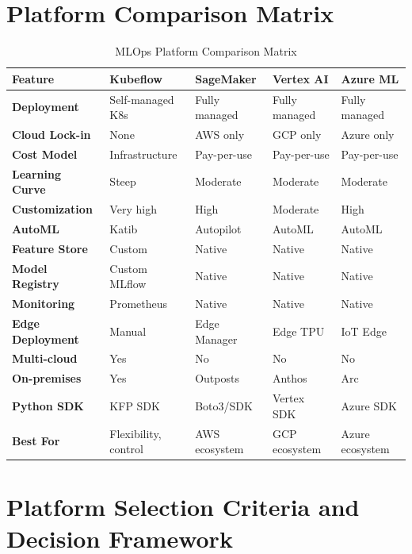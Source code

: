 \section{Platform Comparison Matrix}

\begin{table}[h]
\centering
\small
\begin{tabular}{|p{3.2cm}|p{2.3cm}|p{2.3cm}|p{2.3cm}|p{2.3cm}|}
\hline
\textbf{Feature} & \textbf{Kubeflow} & \textbf{SageMaker} & \textbf{Vertex AI} & \textbf{Azure ML} \\
\hline
\textbf{Deployment} & Self-managed K8s & Fully managed & Fully managed & Fully managed \\
\hline
\textbf{Cloud Lock-in} & None & AWS only & GCP only & Azure only \\
\hline
\textbf{Cost Model} & Infra\-structure & Pay-per-use & Pay-per-use & Pay-per-use \\
\hline
\textbf{Learning Curve} & Steep & Moderate & Moderate & Moderate \\
\hline
\textbf{Customization} & Very high & High & Moderate & High \\
\hline
\textbf{AutoML} & Katib & Autopilot & AutoML & AutoML \\
\hline
\textbf{Feature Store} & Custom & Native & Native & Native \\
\hline
\textbf{Model Registry} & \shortstack{Custom\\MLflow} & Native & Native & Native \\
\hline
\textbf{Monitoring} & Prometheus & Native & Native & Native \\
\hline
\textbf{Edge Deployment} & Manual & Edge Manager & Edge TPU & IoT Edge \\
\hline
\textbf{Multi-cloud} & Yes & No & No & No \\
\hline
\textbf{On-premises} & Yes & Outposts & Anthos & Arc \\
\hline
\textbf{Python SDK} & KFP SDK & Boto3/SDK & Vertex SDK & Azure SDK \\
\hline
\textbf{Best For} & Flexibility, control & AWS ecosystem & GCP ecosystem & Azure ecosystem \\
\hline
\end{tabular}
\caption{MLOps Platform Comparison Matrix}
\end{table}

\section{Platform Selection Criteria and Decision Framework}

